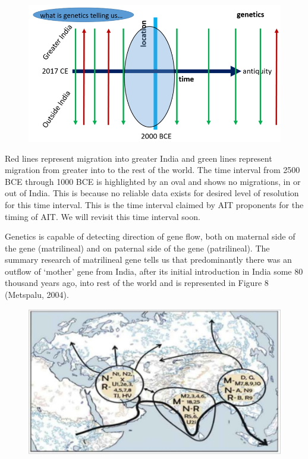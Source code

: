 \begin{figure}[!htbp]
\includegraphics[scale=0.25]{images/8-07.jpg}
\caption{}\label{art8-fig07}
\end{figure}

Red lines represent migration into greater India and green lines represent migration from greater into to the rest of the world. The time interval from 2500 BCE through 1000 BCE is highlighted by an oval and shows no migrations, in or out of India. This is because no reliable data exists for desired level of resolution for this time interval. This is the time interval claimed by AIT proponents for the timing of AIT. We will revisit this time interval soon.

Genetics is capable of detecting direction of gene flow, both on maternal side of the gene (matrilineal) and on paternal side of the gene (patrilineal). The summary research of matrilineal gene tells us that predominantly there was an outflow of ‘mother’ gene from India, after its initial introduction in India some 80 thousand years ago, into rest of the world and is represented in Figure 8 (Metspalu, 2004).

\begin{figure}[!htbp]
\includegraphics[scale=0.26]{images/8-08.jpg}
\caption{}\label{art8-fig08}
\end{figure}

